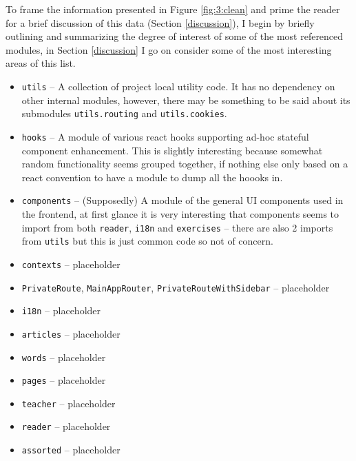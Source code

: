 \documentclass{article}
\begin{document}
To frame the information presented in Figure \ref{fig:3:clean} and prime the reader 
for a brief discussion of this data (Section \ref{discussion}),
I begin by briefly outlining and summarizing the degree of interest of some of the most referenced modules,
in Section \ref{discussion} I go on consider some of the most interesting areas of this list.

\begin{itemize}
  \item \verb|utils| -- A collection of project local utility code.
                        It has no dependency on other internal modules, 
                        however, 
                        there may be something to be said about
                        its submodules \verb|utils.routing| and \verb|utils.cookies|.
  \item \verb|hooks| -- A module of various react hooks supporting ad-hoc stateful component enhancement.
                        This is slightly interesting because somewhat random functionality seems grouped together,
                        if nothing else only based on a react convention to have a module to dump all the hoooks in.
  \item \verb|components| -- (Supposedly) A module of the general UI components used in the frontend,
                             at first glance it is very interesting that components seems to import from both \verb|reader|, \verb|i18n| and \verb|exercises| -- there are also 2 imports from \verb|utils| but this is just common code so not of concern.
  \item \verb|contexts| -- placeholder
  \item \verb|PrivateRoute|, \verb|MainAppRouter|, \verb|PrivateRouteWithSidebar| -- placeholder
  \item \verb|i18n| -- placeholder
  \item \verb|articles| -- placeholder
  \item \verb|words| -- placeholder
  \item \verb|pages| -- placeholder
  \item \verb|teacher| -- placeholder
  \item \verb|reader| -- placeholder
  \item \verb|assorted| -- placeholder
\end{itemize}
\end{document}
